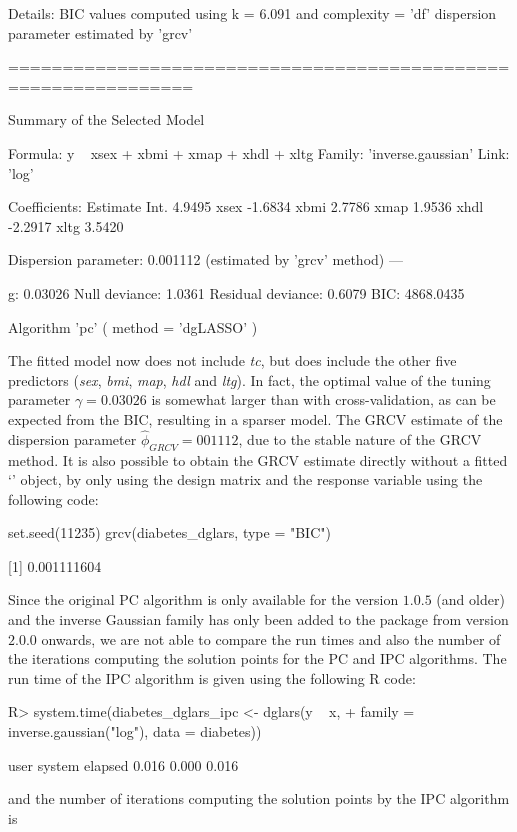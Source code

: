 \begin{example}
Details:
	 BIC values computed using k = 6.091 and complexity = 'df'
	 dispersion parameter estimated by 'grcv'

===============================================================

Summary of the Selected Model

    Formula: y ~ xsex + xbmi + xmap + xhdl + xltg
     Family: 'inverse.gaussian'
       Link: 'log'

Coefficients:
     Estimate
Int.   4.9495
xsex  -1.6834
xbmi   2.7786
xmap   1.9536
xhdl  -2.2917
xltg   3.5420

Dispersion parameter: 0.001112 (estimated by 'grcv' method)
---

                 g: 0.03026
     Null deviance:    1.0361 
 Residual deviance:    0.6079 
               BIC: 4868.0435 

 Algorithm 'pc' ( method = 'dgLASSO' )
\end{example}

The fitted model now does not include \emph{tc}, but does include the other five predictors (\textit{sex}, \textit{bmi}, \textit{map}, \textit{hdl} and \textit{ltg}). In fact, the optimal value of the tuning parameter $\gamma=0.03026$ is somewhat larger than with cross-validation, as can be expected from the BIC, resulting in a sparser model. The GRCV estimate of the dispersion parameter $\hat{\phi}_{GRCV}= 001112$, due to the stable nature of the GRCV method. It is also possible to obtain the GRCV estimate directly without a fitted `' object, by only using the design matrix  and the response variable  using the following  code:

\begin{example}
set.seed(11235)
grcv(diabetes_dglars, type = "BIC")

[1] 0.001111604
\end{example}

Since the original PC algorithm is only available for the version $1.0.5$ (and older) and the inverse Gaussian family has only been  added to the package from  version $2.0.0$ onwards, we are not able to compare the run times and also the number of the iterations computing the solution points for the PC and IPC algorithms. The run time of the IPC algorithm is given using the following {R} code:

\begin{example}
R> system.time(diabetes_dglars_ipc <- dglars(y ~ x, 
+              family = inverse.gaussian("log"), data = diabetes))

user  system elapsed 
0.016   0.000   0.016 
\end{example}
and the number of iterations computing the solution points by the IPC algorithm is

